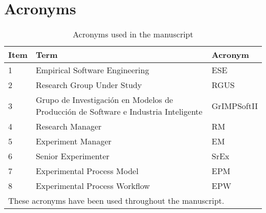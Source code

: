 \appendices
\section{Acronyms}

\begin{table}[h]
	\caption{Acronyms used in the manuscript}
	\label{table}
	\setlength{\tabcolsep}{3pt}
	\begin{tabular}{|p{25pt}|p{115pt}|p{25pt}|}
	\hline
	Item & Term & Acronym\\
	\hline
	1 & Empirical Software Engineering & ESE\\
	\hline
	2 & Research Group Under Study & RGUS\\
	\hline
	3 & Grupo de Investigación en Modelos de Producción de Software e Industria Inteligente & GrIMPSoftII\\
	\hline
	4 & Research Manager & RM\\
	\hline
	5 & Experiment Manager & EM\\
	\hline
	6 & Senior Experimenter & SrEx\\
	\hline
	7 & Experimental Process Model & EPM\\
	\hline
	8 & Experimental Process Workflow & EPW\\
	\hline
	\multicolumn{3}{p{251pt}}{These acronyms have been used throughout the manuscript.}\\
	\end{tabular}
	\label{tab1}
\end{table}
